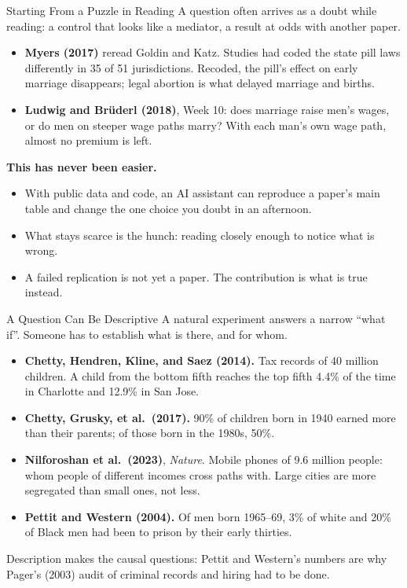 \documentclass[aspectratio=169,11pt,xcolor=dvipsnames]{beamer}
\begin{document}
\begin{frame}{Starting From a Puzzle in Reading}
A question often arrives as a doubt while reading: a control that looks like a mediator, a
result at odds with another paper.
\begin{itemize}\itemsep3pt
  \item \textbf{Myers (2017)} reread Goldin and Katz. Studies had coded the state pill laws
        differently in 35 of 51 jurisdictions. Recoded, the pill's effect on early marriage
        disappears; legal abortion is what delayed marriage and births.
  \item \textbf{Ludwig and Br\"uderl (2018)}, Week 10: does marriage raise men's wages, or do men on
        steeper wage paths marry? With each man's own wage path, almost no premium is left.
\end{itemize}
\textbf{This has never been easier.}
\begin{itemize}\itemsep3pt
  \item With public data and code, an AI assistant can reproduce a paper's main table and change
        the one choice you doubt in an afternoon.
  \item What stays scarce is the hunch: reading closely enough to notice what is wrong.
  \item A failed replication is not yet a paper. The contribution is what is true instead.
\end{itemize}
\end{frame}

\begin{frame}{A Question Can Be Descriptive}
A natural experiment answers a narrow ``what if''. Someone has to establish what is there, and
for whom.
\begin{itemize}\itemsep2pt
  \item \textbf{Chetty, Hendren, Kline, and Saez (2014).} Tax records of 40 million children. A
        child from the bottom fifth reaches the top fifth 4.4\% of the time in Charlotte and
        12.9\% in San Jose.
  \item \textbf{Chetty, Grusky, et al.\ (2017).} 90\% of children born in 1940 earned more than
        their parents; of those born in the 1980s, 50\%.
  \item \textbf{Nilforoshan et al.\ (2023)}, \textit{Nature}. Mobile phones of 9.6 million people:
        whom people of different incomes cross paths with. Large cities are more segregated than
        small ones, not less.
  \item \textbf{Pettit and Western (2004).} Of men born 1965--69, 3\% of white and 20\% of Black men
        had been to prison by their early thirties.
\end{itemize}
\vskip2pt
Description makes the causal questions: Pettit and Western's numbers are why Pager's (2003)
audit of criminal records and hiring had to be done.
\end{frame}
\end{document}
